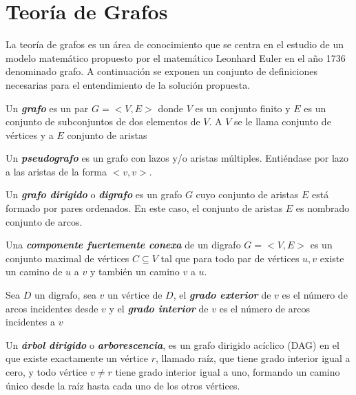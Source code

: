 \section{Teor\'ia de Grafos}\label{section:graphs}

La teoría de grafos es un \'area de conocimiento que se centra en el estudio de un modelo matemático 
propuesto por el matemático Leonhard Euler en el año 1736 denominado grafo\cite{estrada2012structure}. A continuaci\'on 
se exponen un conjunto de definiciones necesarias para el entendimiento de la solución propuesta.

\begin{definition}
    Un \textbf{\textit{grafo}} es un par $G = <V, E>$ donde $V$ es un conjunto finito y $E$ es un 
    conjunto de subconjuntos de dos elementos de $V$. A $V$ se le llama conjunto de v\'ertices y 
    a $E$ conjunto de aristas
\end{definition}

\begin{definition}
    Un \textbf{\textit{pseudografo}} es un grafo con lazos y/o aristas m\'ultiples. Entiéndase por 
    lazo a las aristas de la forma $<v,v>$.
\end{definition}

\begin{definition}
    Un \textbf{\textit{grafo dirigido}} o \textbf{\textit{digrafo}} es un grafo $G$ cuyo conjunto de 
    aristas $E$ est\'a formado por pares ordenados. En este caso, el conjunto de aristas $E$ es nombrado 
    conjunto de arcos.
\end{definition}

\begin{definition}
    Una \textbf{\textit{componente fuertemente conexa}} de un digrafo $G=<V,E>$ es un conjunto maximal 
    de v\'ertices $C \subseteq V$ tal que para todo par de v\'ertices $u,v$ existe un camino de $u$ 
    a $v$ y tambi\'en un camino $v$ a $u$. 
\end{definition}

\begin{definition}
    Sea $D$ un digrafo, sea $v$ un v\'ertice de $D$, el \textbf{\textit{grado exterior}} de $v$ es el 
    n\'umero de arcos incidentes desde $v$ y el \textbf{\textit{grado interior}} de $v$ es el n\'umero 
    de arcos incidentes a $v$
\end{definition}

\begin{definition}
    Un \textbf{\textit{\'arbol dirigido}} o \textbf{\textit{arborescencia}}, es un 
    grafo dirigido acíclico (DAG) en el que existe exactamente un vértice $r$, llamado raíz, que tiene grado interior 
    igual a cero, y todo v\'ertice $v \neq r$ tiene grado interior igual a uno, formando un camino 
    único desde la raíz hasta cada uno de los otros vértices.
\end{definition}

